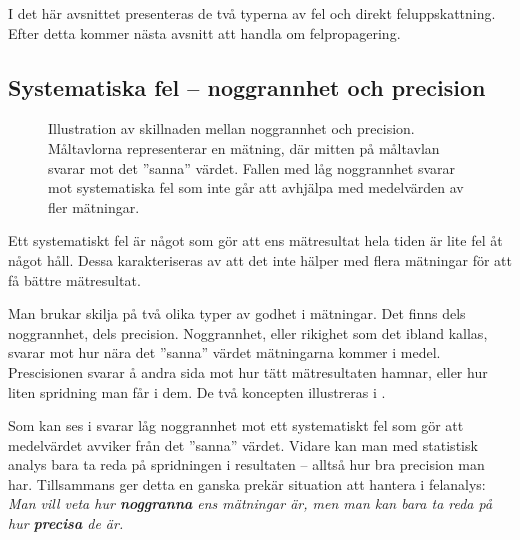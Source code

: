 \documentclass[11pt,a4paper, swedish
]{article}
\begin{document}
I det här avsnittet presenteras de två typerna av fel och direkt
feluppskattning. Efter detta kommer nästa avsnitt att handla om
felpropagering. 


\subsection{Systematiska fel -- noggrannhet och precision}
\begin{figure}
\centering
\resizebox{0.5\textwidth}{!}{

}
\caption{Illustration av skillnaden mellan noggrannhet och
  precision. Måltavlorna representerar en mätning, där mitten på
  måltavlan svarar mot det ''sanna'' värdet. Fallen med låg
  noggrannhet svarar mot systematiska fel som inte går att avhjälpa
  med medelvärden av fler mätningar.}
\label{fig:prec_nog}
\end{figure}

Ett systematiskt fel är något som gör att ens mätresultat hela tiden
är lite fel åt något håll\footnotemark{}. Dessa karakteriseras av att
det inte hälper med flera mätningar för att få bättre mätresultat.

Man brukar skilja på två olika typer av godhet i mätningar. Det finns
dels noggrannhet, dels precision. Noggrannhet, eller rikighet som det
ibland kallas, svarar mot hur nära det ''sanna''\footnotemark{} värdet
mätningarna kommer i medel. Prescisionen svarar å andra sida mot hur
tätt mätresultaten hamnar, eller hur liten spridning man får i dem. De
två koncepten illustreras i .  

Som kan ses i  svarar låg noggrannhet mot ett
systematiskt fel som gör att medelvärdet avviker från det ''sanna''
värdet. Vidare kan man med statistisk analys bara ta reda på
spridningen i resultaten -- alltså hur bra precision man
har. Tillsammans ger detta en ganska prekär situation att hantera i
felanalys: 
\emph{Man vill veta hur {\bf noggranna} ens mätningar är, men man kan bara
  ta reda på hur {\bf precisa} de är.} 
\end{document}
